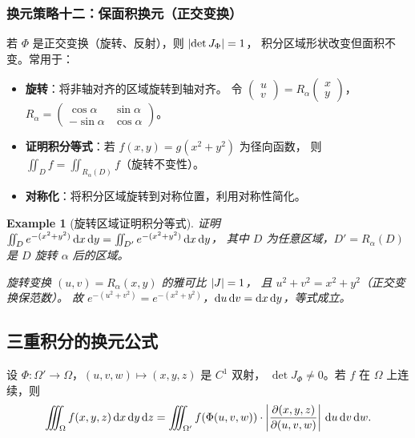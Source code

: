 \documentclass{ctexart}
\newtheorem{example}[theorem]{Example}
\begin{document}
\subsubsection*{换元策略十二：保面积换元（正交变换）}

若 $\Phi$ 是正交变换（旋转、反射），则 $\left| \det J_\Phi \right| = 1$，
积分区域形状改变但面积不变。常用于：
\begin{itemize}
  \item \textbf{旋转}：将非轴对齐的区域旋转到轴对齐。
    令 $\begin{pmatrix} u \\ v \end{pmatrix}
    = R_\alpha \begin{pmatrix} x \\ y \end{pmatrix}$，
    $R_\alpha = \begin{pmatrix} \cos\alpha & \sin\alpha \\ -\sin\alpha & \cos\alpha \end{pmatrix}$。
  \item \textbf{证明积分等式}：若 $f(x,y) = g(x^2+y^2)$ 为径向函数，
    则 $\iint_D f = \iint_{R_\alpha(D)} f$（旋转不变性）。
  \item \textbf{对称化}：将积分区域旋转到对称位置，利用对称性简化。
\end{itemize}

\begin{example}[旋转区域证明积分等式]
  证明 $\iint_D e^{-(x^2+y^2)}\,\mathrm{d} x\,\mathrm{d} y
  = \iint_{D'} e^{-(x^2+y^2)}\,\mathrm{d} x\,\mathrm{d} y$，
  其中 $D$ 为任意区域，$D' = R_\alpha(D)$ 是 $D$ 旋转 $\alpha$ 后的区域。

  旋转变换 $(u,v) = R_\alpha(x,y)$ 的雅可比 $\left| J \right| = 1$，
  且 $u^2+v^2 = x^2+y^2$（正交变换保范数）。
  故 $e^{-(u^2+v^2)} = e^{-(x^2+y^2)}$，$\mathrm{d} u\,\mathrm{d} v = \mathrm{d} x\,\mathrm{d} y$，等式成立。
\end{example}

\subsection{三重积分的换元公式}

\begin{theorem}[三重积分换元公式]
  设 $\Phi: \Omega' \to \Omega$，$(u,v,w) \mapsto (x,y,z)$ 是 $C^1$ 双射，
  $\det J_\Phi \ne 0$。若 $f$ 在 $\Omega$ 上连续，则
  \[
    \iiint_\Omega f(x,y,z) \,\mathrm{d} x\,\mathrm{d} y\,\mathrm{d} z
    = \iiint_{\Omega'} f(\Phi(u,v,w)) \cdot
      \left| \frac{\partial(x,y,z)}{\partial(u,v,w)} \right| \,\mathrm{d} u\,\mathrm{d} v\,\mathrm{d} w.
  \]
\end{theorem}
\end{document}
